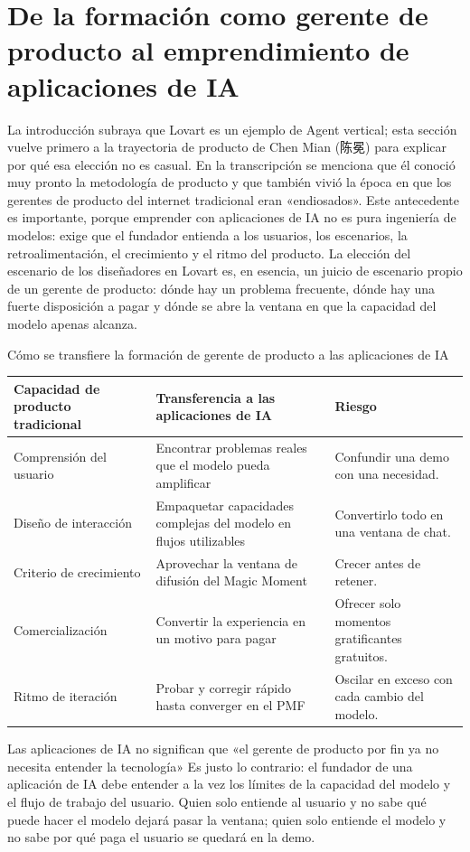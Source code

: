 \section{De la formación como gerente de producto al emprendimiento de aplicaciones de IA}

La introducción subraya que Lovart es un ejemplo de Agent vertical; esta sección vuelve primero a la trayectoria de producto de Chen Mian (陈冕) para explicar por qué esa elección no es casual. En la transcripción se menciona que él conoció muy pronto la metodología de producto y que también vivió la época en que los gerentes de producto del internet tradicional eran «endiosados». Este antecedente es importante, porque emprender con aplicaciones de IA no es pura ingeniería de modelos: exige que el fundador entienda a los usuarios, los escenarios, la retroalimentación, el crecimiento y el ritmo del producto. La elección del escenario de los diseñadores en Lovart es, en esencia, un juicio de escenario propio de un gerente de producto: dónde hay un problema frecuente, dónde hay una fuerte disposición a pagar y dónde se abre la ventana en que la capacidad del modelo apenas alcanza.

\begin{knowledgebox}{Cómo se transfiere la formación de gerente de producto a las aplicaciones de IA}
\begin{tabularx}{\textwidth}{p{}p{}X}
\toprule
Capacidad de producto tradicional & Transferencia a las aplicaciones de IA & Riesgo \\
\midrule
Comprensión del usuario & Encontrar problemas reales que el modelo pueda amplificar & Confundir una demo con una necesidad. \\
Diseño de interacción & Empaquetar capacidades complejas del modelo en flujos utilizables & Convertirlo todo en una ventana de chat. \\
Criterio de crecimiento & Aprovechar la ventana de difusión del Magic Moment & Crecer antes de retener. \\
Comercialización & Convertir la experiencia en un motivo para pagar & Ofrecer solo momentos gratificantes gratuitos. \\
Ritmo de iteración & Probar y corregir rápido hasta converger en el PMF & Oscilar en exceso con cada cambio del modelo. \\
\bottomrule
\end{tabularx}
\end{knowledgebox}

\begin{warningbox}{Las aplicaciones de IA no significan que «el gerente de producto por fin ya no necesita entender la tecnología»}
Es justo lo contrario: el fundador de una aplicación de IA debe entender a la vez los límites de la capacidad del modelo y el flujo de trabajo del usuario. Quien solo entiende al usuario y no sabe qué puede hacer el modelo dejará pasar la ventana; quien solo entiende el modelo y no sabe por qué paga el usuario se quedará en la demo.
\end{warningbox}

